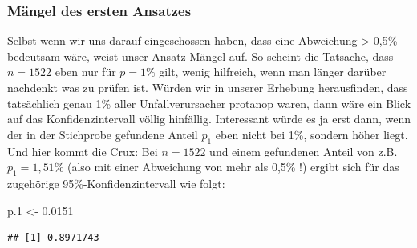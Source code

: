 \documentclass[
]{article}
\newenvironment{Shaded}{\begin{snugshade}}{\end{snugshade}}
\newcommand{\CommentTok}[1]{\textcolor[rgb]{0.56,0.35,0.01}{\textit{#1}}}
\newcommand{\DecValTok}[1]{\textcolor[rgb]{0.00,0.00,0.81}{#1}}
\newcommand{\FloatTok}[1]{\textcolor[rgb]{0.00,0.00,0.81}{#1}}
\newcommand{\KeywordTok}[1]{\textcolor[rgb]{0.13,0.29,0.53}{\textbf{#1}}}
\newcommand{\NormalTok}[1]{#1}
\newcommand{\OperatorTok}[1]{\textcolor[rgb]{0.81,0.36,0.00}{\textbf{#1}}}
\newcommand{\StringTok}[1]{\textcolor[rgb]{0.31,0.60,0.02}{#1}}
\begin{document}
\hypertarget{muxe4ngel-des-ersten-ansatzes}{%
\subsubsection{Mängel des ersten
Ansatzes}\label{muxe4ngel-des-ersten-ansatzes}}

Selbst wenn wir uns darauf eingeschossen haben, dass eine Abweichung
\textgreater{} 0,5\% bedeutsam wäre, weist unser Ansatz Mängel auf. So
scheint die Tatsache, dass \(n=1522\) eben nur für \(p=1\%\) gilt, wenig
hilfreich, wenn man länger darüber nachdenkt was zu prüfen ist. Würden
wir in unserer Erhebung herausfinden, dass tatsächlich genau 1\% aller
Unfallverursacher protanop waren, dann wäre ein Blick auf das
Konfidenzintervall völlig hinfällig. Interessant würde es ja erst dann,
wenn der in der Stichprobe gefundene Anteil \(p_1\) eben nicht bei 1\%,
sondern höher liegt. Und hier kommt die Crux: Bei \(n=1522\) und einem
gefundenen Anteil von z.B. \(p_1=1,51\%\) (also mit einer Abweichung von
mehr als 0,5\% !) ergibt sich für das zugehörige 95\%-Konfidenzintervall
wie folgt:

\begin{Shaded}
\begin{Highlighting}[]
\NormalTok{p}\FloatTok{.1}\NormalTok{ <-}\StringTok{ }\FloatTok{0.0151}
\end{Highlighting}
\end{Shaded}

\begin{Shaded}
\end{Shaded}

\begin{verbatim}
## [1] 0.8971743
\end{verbatim}

\begin{Shaded}
\end{Shaded}
\end{document}
